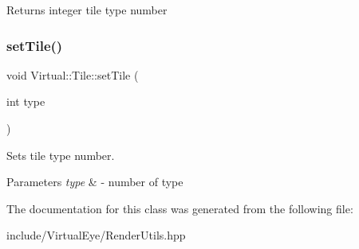 \begin{DoxyReturn}{Returns}
integer tile type number 
\end{DoxyReturn}
\hypertarget{class_virtual_1_1_tile_a7e275a90e1b528130445c8e053d4dc66}{}\label{class_virtual_1_1_tile_a7e275a90e1b528130445c8e053d4dc66} 
\subsubsection{\texorpdfstring{set\+Tile()}{setTile()}}
{\footnotesize\ttfamily void Virtual\+::\+Tile\+::set\+Tile (\begin{DoxyParamCaption}\item[{int}]{type }\end{DoxyParamCaption})}



Sets tile type number. 


\begin{DoxyParams}{Parameters}
{\em type} & -\/ number of type \\
\hline
\end{DoxyParams}


The documentation for this class was generated from the following file\+:\begin{DoxyCompactItemize}
\item 
include/\+Virtual\+Eye/Render\+Utils.\+hpp\end{DoxyCompactItemize}
